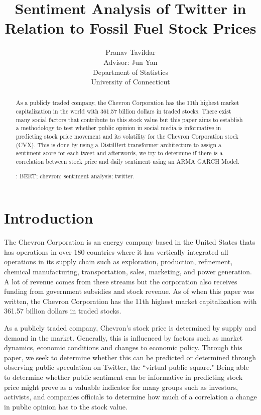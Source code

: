 \documentclass[12pt, letterpaper, titlepage]{article}
\title{Sentiment Analysis of Twitter in Relation to Fossil Fuel Stock Prices}
\author{Pranav Tavildar\\[2ex]
  Advisor: Jun Yan\\[2ex]
  Department of Statistics\\
  University of Connecticut
}
\newcommand{\jy}[1]{\textcolor{blue}{JY: #1}}
\begin{document}
\maketitle
\doublespace

\begin{abstract}
As a publicly traded company, the Chevron Corporation has the 11th highest market capitalization in the world with 361.57 billion dollars in traded stocks. There exist many social factors that contribute to this stock value but this paper aims to establish a methodology to test whether public opinion in social media is informative in predicting stock price movement and its volatility for the Chevron Corporation stock (CVX). This is done by using a DistilBert transformer architecture to assign a sentiment score for each tweet and afterwords, we try to determine if there is a correlation between stock price and daily sentiment using an ARMA GARCH Model.



\bigskip
{}:
BERT;
chevron;
sentiment analysis;
twitter.
\end{abstract}

\section{Introduction}
\label{sec:intro}

The Chevron Corporation is an energy company based in the United States thats has operations in over 180 countries where it has vertically integrated all operations in its supply chain such as exploration, production, refinement, chemical manufacturing, transportation, sales, marketing, and power generation. A lot of revenue comes from these streams but the corporation also receives funding from government subsidies and stock revenue. As of when this paper was written, the Chevron Corporation has the 11th highest market capitalization with 361.57 billion dollars in traded stocks.

As a publicly traded company, Chevron's stock price is determined by supply and demand in the market. Generally, this is influenced by factors such as market dynamics, economic conditions and changes to economic policy. Through this paper, we seek to determine whether this can be predicted or determined through observing public speculation on Twitter, the ``virtual public square." Being able to determine whether public sentiment can be informative in predicting stock price might prove as a valuable indicator for many groups such as investors, activists, and companies officials to determine how much of a correlation a change in public opinion has to the stock value.  	
\end{document}
